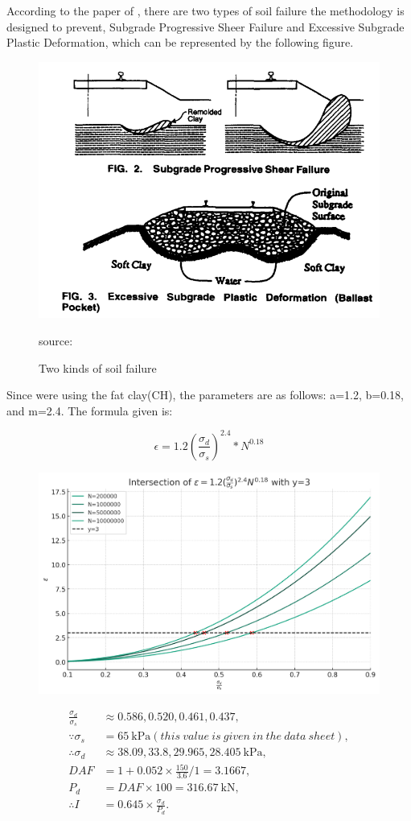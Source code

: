 \documentclass[letterpaper,12pt,leqno]{article}
\begin{document}
	According to the paper of \cite{LiSelig1998}, there are two types of soil failure the methodology is
	designed to prevent, Subgrade Progressive Sheer Failure and Excessive
	Subgrade Plastic Deformation, which can be represented by the following
	 figure.
	\begin{figure}[H]
		\centering
		\includegraphics[width=0.8\linewidth]{figure/soilfailure.png}
		\caption{Two kinds of soil failure}
		\small{source: \cite{LiSelig1998}}
		\label{fig:soilfailure}
		
	\end{figure}
	
	Since we\textquotesingle re using the fat clay(CH), the parameters are
	as follows: a=1.2, b=0.18, and m=2.4. The formula given is:
	
	\[\epsilon=1.2(\frac{\sigma_d}{\sigma_s})^{2.4}*N^{0.18}\]
	\begin{figure}[H]
		\centering
		\includegraphics[width=0.8\linewidth]{figure/2.png}
		\label{fig:2}
	\end{figure}
	
	
	\begin{align*}
		\frac{\sigma_d}{\sigma_s} &\approx 0.586, 0.520, 0.461, 0.437, \\
		\because \sigma_s &= 65\ \text{kPa}(this\ value\ is\ given\ in\ the\ data\ sheet), \\
		\therefore \sigma_d &\approx 38.09, 33.8, 29.965, 28.405\ \text{kPa}, \\
		DAF &= 1 + 0.052 \times \frac{150}{3.6} / 1 = 3.1667, \\
		P_d &= DAF \times 100 = 316.67\ \text{kN}, \\
		\therefore I &= 0.645 \times \frac{\sigma_d}{P_d}.
	\end{align*}
	
\end{document}
